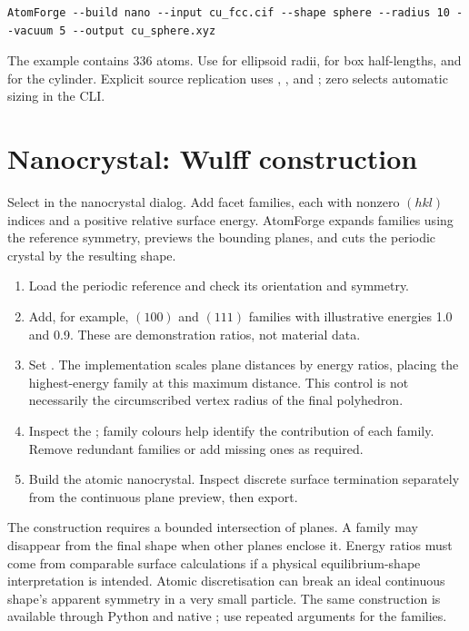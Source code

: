 \begin{lstlisting}
AtomForge --build nano --input cu_fcc.cif --shape sphere --radius 10 --vacuum 5 --output cu_sphere.xyz
\end{lstlisting}
The example contains 336 atoms. Use  for ellipsoid radii,  for box half-lengths, and  for the cylinder. Explicit source replication uses , , and ; zero selects automatic sizing in the CLI.

\section{Nanocrystal: Wulff construction}
Select  in the nanocrystal dialog. Add facet families, each with nonzero $(hkl)$ indices and a positive relative surface energy. AtomForge expands families using the reference symmetry, previews the bounding planes, and cuts the periodic crystal by the resulting shape.

\begin{enumerate}
\item Load the periodic reference and check its orientation and symmetry.
\item Add, for example, $(100)$ and $(111)$ families with illustrative energies 1.0 and 0.9. These are demonstration ratios, not material data.
\item Set . The implementation scales plane distances by energy ratios, placing the highest-energy family at this maximum distance. This control is not necessarily the circumscribed vertex radius of the final polyhedron.
\item Inspect the ; family colours help identify the contribution of each family. Remove redundant families or add missing ones as required.
\item Build the atomic nanocrystal. Inspect discrete surface termination separately from the continuous plane preview, then export.
\end{enumerate}
The construction requires a bounded intersection of planes. A family may disappear from the final shape when other planes enclose it. Energy ratios must come from comparable surface calculations if a physical equilibrium-shape interpretation is intended. Atomic discretisation can break an ideal continuous shape's apparent symmetry in a very small particle. The same construction is available through Python  and native ; use repeated  arguments for the families.

